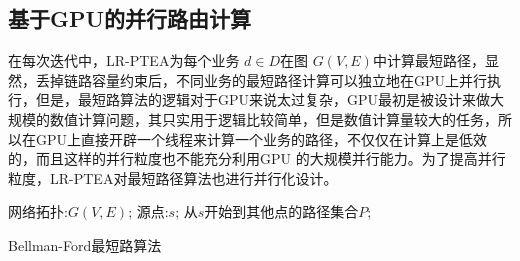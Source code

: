 \subsection{基于GPU的并行路由计算}
在每次迭代中，LR-PTEA为每个业务 $d \in D$在图 $G(V, E)$中计算最短路径，显然，丢掉链路容量约束后，不同业务的最短路径计算可以独立地在GPU上并行执行，但是，最短路算法的逻辑对于GPU来说太过复杂，GPU最初是被设计来做大规模的数值计算问题，其只实用于逻辑比较简单，但是数值计算量较大的任务，所以在GPU上直接开辟一个线程来计算一个业务的路径，不仅仅在计算上是低效的，而且这样的并行粒度也不能充分利用GPU 的大规模并行能力。为了提高并行粒度，LR-PTEA对最短路径算法也进行并行化设计。
\begin{algorithm}[htb]
\begin{algorithmic}[1]
\Require
网络拓扑:$G(V, E)$;
源点:$s$;
\Ensure
从$s$开始到其他点的路径集合$P$;
\EndFor
{}
\EndIf
\EndFor
\EndWhile
{}
\end{algorithmic}
\caption{{Bellman-Ford最短路算法}}
\label{Bellman}
\end{algorithm}


